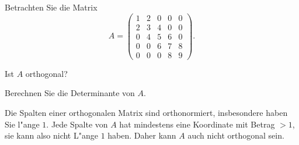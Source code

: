 Betrachten Sie die Matrix
\[
A=
\begin{pmatrix}
1&2&0&0&0\\
2&3&4&0&0\\
0&4&5&6&0\\
0&0&6&7&8\\
0&0&0&8&9
\end{pmatrix}.
\]
\begin{teilaufgaben}
\item Ist $A$ orthogonal?
\item Berechnen Sie die Determinante von $A$.
\end{teilaufgaben}

\begin{loesung}
\begin{teilaufgaben}
\item
Die Spalten einer orthogonalen Matrix sind orthonormiert,
insbesondere haben Sie l"ange $1$. Jede Spalte von $A$ hat mindestens eine
Koordinate mit Betrag $>1$, sie kann also nicht L"ange $1$ haben.
Daher kann $A$ auch nicht orthogonal sein.


\end{teilaufgaben}
\end{loesung}
